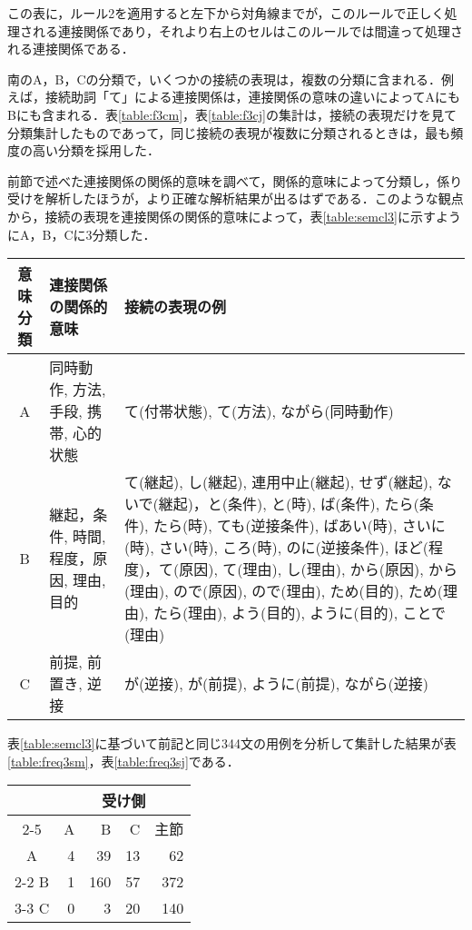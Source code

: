この表に，ルール2を適用すると左下から対角線までが，このルールで正しく処理される連接関係であり，それより右上のセルはこのルールでは間違って処理される連接関係である．

南のA，B，Cの分類で，いくつかの接続の表現は，複数の分類に含まれる．例えば，接続助詞「て」による連接関係は，連接関係の意味の違いによってAにもBにも含まれる．表\ref{table:f3cm}，表\ref{table:f3cj}の集計は，接続の表現だけを見て分類集計したものであって，同じ接続の表現が複数に分類されるときは，最も頻度の高い分類を採用した．

前節で述べた連接関係の関係的意味を調べて，関係的意味によって分類し，係り受けを解析したほうが，より正確な解析結果が出るはずである．このような観点から，接続の表現を連接関係の関係的意味によって，表\ref{table:semcl3}に示すようにA，B，Cに3分類した．

\begin{table*}
\caption{連接関係の意味分類（A，B，Cの3分類）}
\label{table:semcl3}
\begin{tabular}{|c|p{}| p{}|}
\hline
\multicolumn{1}{|p{5zw}|}{意味分類} & \multicolumn{1}{|p{12zw}|}{連接関係の関係的意味} & \multicolumn{1}{|p{20zw}|}{接続の表現の例}\\
\hline
A & 同時動作, 方法, 手段, 携帯, 心的状態 & て(付帯状態), て(方法), ながら(同時動作) \\
B & 継起，条件, 時間, 程度，原因, 理由, 目的  & て(継起), し(継起), 連用中止(継起), せず(継起), ないで(継起)，と(条件), と(時), ば(条件), たら(条件), たら(時), ても(逆接条件), ばあい(時), さいに(時), さい(時), ころ(時), のに(逆接条件), ほど(程度)，て(原因), て(理由), し(理由), から(原因), から(理由), ので(原因), ので(理由), ため(目的), ため(理由), たら(理由), よう(目的), ように(目的), ことで(理由) \\
C & 前提, 前置き, 逆接 & が(逆接), が(前提), ように(前提), ながら(逆接)\\
\hline
\end{tabular}
\end{table*}

\newpage
表\ref{table:semcl3}に基づいて前記と同じ344文の用例を分析して集計した結果が表\ref{table:freq3sm}，表\ref{table:freq3sj}である．

\begin{table*}
\caption{用例における係り受け連接関係の頻度（A，B，Cの3分類で連接関係の関係的意味による）}
\label{table:freq3sm}
\hspace*{25mm}
\begin{tabular}{|c|r|r|r|r|}
\hline
\multicolumn{1}{|p{4zw}|}{} & \multicolumn{4}{|c|}{受け側}\\
\cline{2-5}
\multicolumn{1}{|p{4zw}|}{係り側} & \multicolumn{1}{|p{3zw}|}{A} & \multicolumn{1}{|p{3zw}|}{B} & \multicolumn{1}{|p{3zw}|}{C} & \multicolumn{1}{|p{3zw}|}{主節} \\
\hline
A & 4 & 39 & 13 & 62 \\
\cline{2-2}
B & 1 & 160 & 57 & 372 \\
\cline{3-3}
C & 0 & 3 & 20 & 140 \\
\hline
\end{tabular}
\end{table*}

